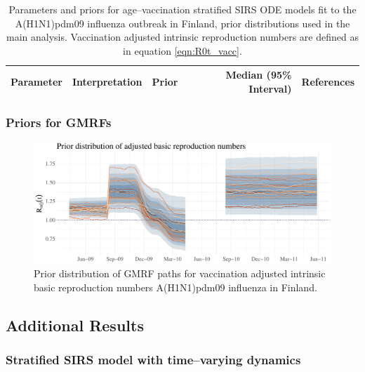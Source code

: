 \begin{table}
	\begin{fullpage}
		\caption[Parameters and priors for age--vaccination stratified SIRS ODE models fit to the A(H1N1)pdm09 influenza outbreak in Finland.]{Parameters and priors for age--vaccination stratified SIRS ODE models fit to the A(H1N1)pdm09 influenza outbreak in Finland, prior distributions used in the main analysis. Vaccination adjusted intrinsic reproduction numbers are defined as in equation \ref{eqn:R0t_vacc}.}
		\label{tab:flu_priors}
		\scriptsize
		\centering
		\begin{tabular}{lllrr}
			\hline
			\textbf{Parameter} &  \textbf{Interpretation} & \textbf{Prior} & \textbf{Median (95\% Interval)} & \textbf{References} \\ \hline
			\hline
		\end{tabular}
	\end{fullpage}
\end{table}

\subsubsection{Priors for GMRFs}
\label{subsubsec:flu_gmrf_priors}

\begin{figure}
	\centering
	\includegraphics[width=\linewidth]{figures/flu_RW1_prior}
	\caption{Prior distribution of GMRF paths for vaccination adjusted intrinsic basic reproduction numbers A(H1N1)pdm09 influenza in Finland.}
	\label{fig:flurw1prior}
\end{figure}


\subsection{Additional Results}
\label{subsec:flu_additional_results}

\subsubsection{Stratified SIRS model with time--varying dynamics}
\label{subsubsec:flu_additional_res_rw1}

